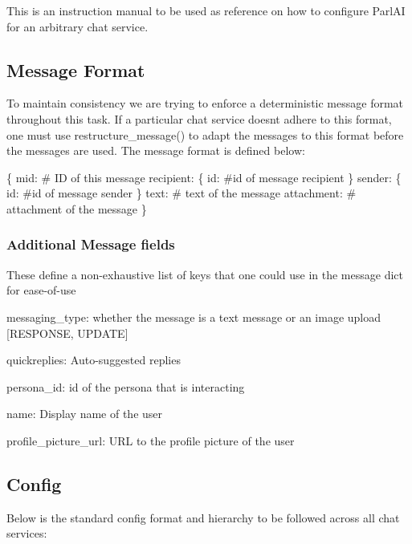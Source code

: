 This is an instruction manual to be used as reference on how to configure Parl\+AI for an arbitrary chat service.

\subsection*{Message Format}

To maintain consistency we are trying to enforce a deterministic message format throughout this task. If a particular chat service doesn\textquotesingle{}t adhere to this format, one must use {\ttfamily restructure\+\_\+message()} to adapt the messages to this format before the messages are used. The message format is defined below\+: 
\begin{DoxyCode}
\{
  mid: # ID of this message
  recipient: \{
    id: #id of message recipient
  \}
  sender: \{
    id: #id of message sender
  \}
  text: # text of the message
  attachment: # attachment of the message
\}
\end{DoxyCode}
 \subsubsection*{Additional Message fields}

These define a non-\/exhaustive list of keys that one could use in the message dict for ease-\/of-\/use
\begin{DoxyItemize}
\item messaging\+\_\+type\+: whether the message is a text message or an image upload \mbox{[}R\+E\+S\+P\+O\+N\+SE, U\+P\+D\+A\+TE\mbox{]}
\item quickreplies\+: Auto-\/suggested replies
\item persona\+\_\+id\+: id of the persona that is interacting
\item name\+: Display name of the user
\item profile\+\_\+picture\+\_\+url\+: U\+RL to the profile picture of the user
\end{DoxyItemize}

\subsection*{Config}

Below is the standard config format and hierarchy to be followed across all chat services\+:

